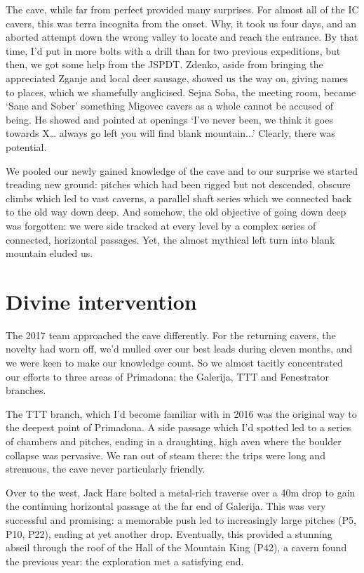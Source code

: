 The cave, while far from perfect provided many surprises. For almost all of the IC cavers, this was terra incognita  from the onset. Why, it took us four days, and an aborted attempt down the wrong valley to locate and reach the entrance. By that time, I’d put in more bolts with a drill than for two previous expeditions, but then, we got some help from the JSPDT. Zdenko, aside from bringing the appreciated Zganje and local deer sausage, showed us the way on, giving names to places, which we shamefully anglicised. Sejna Soba, the meeting room, became ‘Sane and Sober’ something Migovec cavers as a whole cannot be accused of being. He showed and pointed at openings ‘I’ve never been, we think it goes towards X… always go left you will find blank mountain...’ Clearly, there was potential.

We pooled our newly gained knowledge of the cave and to our surprise we started treading new ground: pitches which had been rigged but not descended, obscure climbs which led to vast caverns, a parallel shaft series which we connected back to the old way down deep. And somehow, the old objective of going down deep was forgotten: we were side tracked at every level by a complex series of connected, horizontal passages. Yet, the almost mythical left turn into blank mountain eluded us.

\section{Divine intervention}
The 2017 team approached the cave differently. For the returning cavers, the novelty had worn off, we’d mulled over our best leads during eleven months, and we were keen to make our knowledge count. So we almost tacitly concentrated our efforts to three areas of Primadona: the Galerija, TTT and Fenestrator branches.

The TTT branch, which I’d become familiar with in 2016 was the original way to the deepest point of Primadona. A side passage which I’d spotted led to a series of chambers and pitches, ending in a draughting, high aven where the boulder collapse was pervasive. We ran out of steam there: the trips were long and strenuous, the cave never particularly friendly.

Over to the west, Jack Hare bolted a metal-rich traverse over a 40m drop to gain the continuing horizontal passage at the far end of Galerija. This was very successful and promising: a memorable push led to increasingly large pitches (P5, P10, P22), ending at yet another drop. Eventually, this provided a stunning abseil through the roof of the Hall of the Mountain King (P42), a cavern found the previous year: the exploration met a satisfying end.

